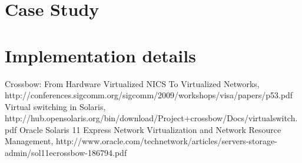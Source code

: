 \documentclass[11pt]{book}
\begin{document}
  \chapter{Case Study}


  \chapter{Implementation details}



  \begin{thebibliography}{some-label}
    
    \bibitem[1]{} Crossbow: From Hardware Virtualized NICS To Virtualized Networks, http://conferences.sigcomm.org/sigcomm/2009/workshops/visa/papers/p53.pdf
    \bibitem[2]{} Virtual switching in Solaris, http://hub.opensolaris.org/bin/download/Project+crossbow/Docs/virtualswitch.pdf
    \bibitem[3]{} Oracle Solaris 11 Express Network Virtualization and Network Resource Management, http://www.oracle.com/technetwork/articles/servers-storage-admin/sol11ecrossbow-186794.pdf

  \end{thebibliography}
\end{document}
